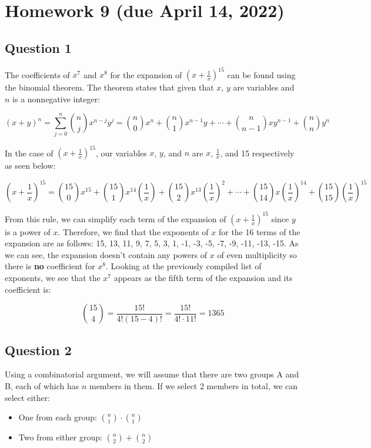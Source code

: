 \documentclass[letterpaper, 12pt]{article}
\begin{document}
\section*{Homework 9 (due April 14, 2022)}

\subsection*{Question 1}
The coefficients of $x^7$ and $x^8$ for the expansion of $(x + \frac{1}{x})^{15}$ can be found using the binomial theorem. The theorem states that given that $x$, $y$ are variables and $n$ is a nonnegative integer:

\[(x+y)^n = \sum_{j=0}^{n} \binom{n}{j}x^{n-j}y^j = \binom{n}{0}x^n + \binom{n}{1}x^{n-1}y + \cdots + \binom{n}{n-1}xy^{n-1} + \binom{n}{n}y^n\]

In the case of $(x + \frac{1}{x})^{15}$, our variables $x$, $y$, and $n$ are $x$, $\frac{1}{x}$, and 15 respectively as seen below:

\[\left(x+ \frac{1}{x}\right)^{15} = \binom{15}{0}x^{15} + \binom{15}{1}x^{14}\left(\frac{1}{x}\right) + \binom{15}{2}x^{13}\left(\frac{1}{x}\right)^2 + \cdots + \binom{15}{14}x\left(\frac{1}{x}\right)^{14} + \binom{15}{15}\left(\frac{1}{x}\right)^{15}\]

From this rule, we can simplify each term of the expansion of $(x + \frac{1}{x})^{15}$ since $y$ is a power of $x$. Therefore, we find that the exponents of $x$ for the 16 terms of the expansion are as follows: 15, 13, 11, 9, 7, 5, 3, 1, -1, -3, -5, -7, -9, -11, -13, -15. As we can see, the expansion doesn't contain any powers of $x$ of even multiplicity so there is \textbf{no} coefficient for $x^8$. Looking at the previously compiled list of exponents, we see that the $x^7$ appears as the fifth term of the expansion and its coefficient is:

\[\binom{15}{4} = \frac{15!}{4!(15-4)!} = \frac{15!}{4! \cdot 11!} = 1365\]

\subsection*{Question 2}
Using a combinatorial argument, we will assume that there are two groups A and B, each of which has $n$ members in them. If we select 2 members in total, we can select either:

\begin{itemize}
    \item One from each group: $\binom{n}{1} \cdot \binom{n}{1}$
    \item Two from either group: $\binom{n}{2} + \binom{n}{2}$
\end{itemize}
\end{document}

